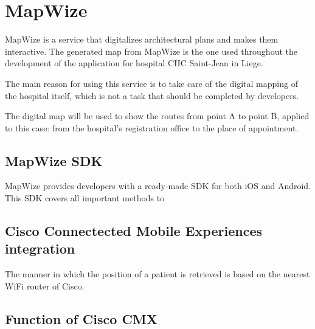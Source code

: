 \section{MapWize}
MapWize is a service that digitalizes architectural plans and makes them interactive.
The generated map from MapWize is the one used throughout the development of the application
for hospital CHC Saint-Jean in Liege.

The main reason for using this service is to take care of the digital mapping of the hospital itself,
which is not a task that should be completed by developers.

The digital map will be used to show the routes from point A to point B, applied to this case:
from the hospital's registration office to the place of appointment.

\subsection{MapWize SDK}
MapWize provides developers with a ready-made SDK for both iOS and Android. This SDK covers
all important methods to 

\subsection{Cisco Connectected Mobile Experiences integration}
The manner in which the position of a patient is retrieved is based on the nearest WiFi router of Cisco.\cite{cscmu}
\subsection{Function of Cisco CMX}




